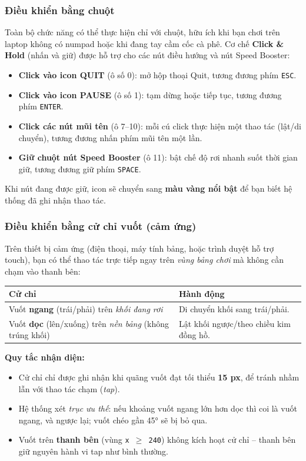 \documentclass[12pt,a4paper]{article}
\begin{document}
\subsubsection{Điều khiển bằng chuột}
Toàn bộ chức năng có thể thực hiện chỉ với chuột, hữu ích khi bạn chơi trên laptop không có numpad hoặc khi đang tay cầm cốc cà phê. Cơ chế \textbf{Click \& Hold} (nhấn và giữ) được hỗ trợ cho các nút điều hướng và nút Speed Booster:
\begin{itemize}
    \item \textbf{Click vào icon QUIT} (ô số 0): mở hộp thoại Quit, tương đương phím \texttt{ESC}.
    \item \textbf{Click vào icon PAUSE} (ô số 1): tạm dừng hoặc tiếp tục, tương đương phím \texttt{ENTER}.
    \item \textbf{Click các nút mũi tên} (ô 7--10): mỗi cú click thực hiện một thao tác (lật/di chuyển), tương đương nhấn phím mũi tên một lần.
    \item \textbf{Giữ chuột nút Speed Booster} (ô 11): bật chế độ rơi nhanh suốt thời gian giữ, tương đương giữ phím \texttt{SPACE}.
\end{itemize}

Khi nút đang được giữ, icon sẽ chuyển sang \textbf{màu vàng nổi bật} để bạn biết hệ thống đã ghi nhận thao tác.

\subsubsection{Điều khiển bằng cử chỉ vuốt (cảm ứng)}
Trên thiết bị cảm ứng (điện thoại, máy tính bảng, hoặc trình duyệt hỗ trợ touch), bạn có thể thao tác trực tiếp ngay trên \textit{vùng bảng chơi} mà không cần chạm vào thanh bên:

\vspace{4pt}
\begin{tabularx}{\linewidth}{|l|X|}
    \hline
    \textbf{Cử chỉ} & \textbf{Hành động} \\
    \hline
    Vuốt \textbf{ngang} (trái/phải) trên \textit{khối đang rơi} & Di chuyển khối sang trái/phải. \\
    \hline
    Vuốt \textbf{dọc} (lên/xuống) trên \textit{nền bảng} (không trúng khối) & Lật khối ngược/theo chiều kim đồng hồ. \\
    \hline
\end{tabularx}

\vspace{4pt}
\noindent\textbf{Quy tắc nhận diện:}
\begin{itemize}
    \item Cử chỉ chỉ được ghi nhận khi quãng vuốt đạt tối thiểu \textbf{15 px}, để tránh nhầm lẫn với thao tác chạm (\textit{tap}).
    \item Hệ thống xét \textit{trục ưu thế}: nếu khoảng vuốt ngang lớn hơn dọc thì coi là vuốt ngang, và ngược lại; vuốt chéo gần 45° sẽ bị bỏ qua.
    \item Vuốt trên \textbf{thanh bên} (vùng \texttt{x $\geq$ 240}) không kích hoạt cử chỉ -- thanh bên giữ nguyên hành vi tap như bình thường.
\end{itemize}
\end{document}
